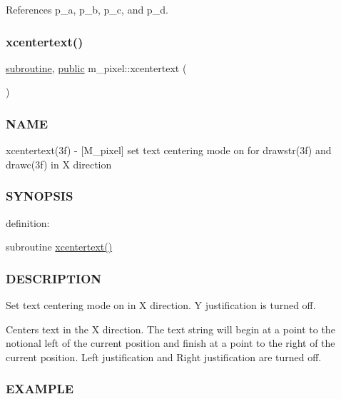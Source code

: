 References p\+\_\+a, p\+\_\+b, p\+\_\+c, and p\+\_\+d.

\mbox{\label{namespacem__pixel_a1e0c43d36b35eafea921f91c31d8a478}} 
\subsubsection{\texorpdfstring{xcentertext()}{xcentertext()}}
{\footnotesize\ttfamily \hyperlink{M__stopwatch_83_8txt_acfbcff50169d691ff02d4a123ed70482}{subroutine}, \hyperlink{M__stopwatch_83_8txt_a2f74811300c361e53b430611a7d1769f}{public} m\+\_\+pixel\+::xcentertext (\begin{DoxyParamCaption}{ }\end{DoxyParamCaption})}



\subsubsection*{N\+A\+ME}

xcentertext(3f) -\/ \mbox{[}M\+\_\+pixel\mbox{]} set text centering mode on for drawstr(3f) and drawc(3f) in X direction 

\subsubsection*{S\+Y\+N\+O\+P\+S\+IS}

definition\+:

subroutine \hyperlink{namespacem__pixel_a1e0c43d36b35eafea921f91c31d8a478}{xcentertext()}

\subsubsection*{D\+E\+S\+C\+R\+I\+P\+T\+I\+ON}

Set text centering mode on in X direction. Y justification is turned off.

Centers text in the X direction. The text string will begin at a point to the notional left of the current position and finish at a point to the right of the current position. Left justification and Right justification are turned off.

\subsubsection*{E\+X\+A\+M\+P\+LE}

